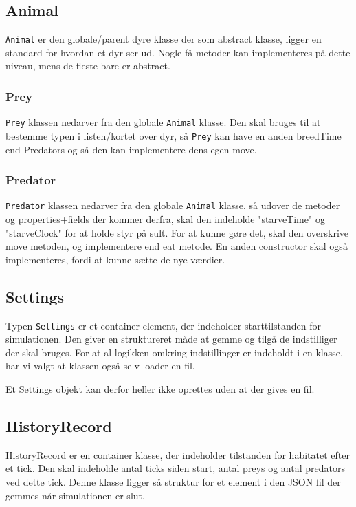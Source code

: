 \documentclass[a4paper]{article}
\begin{document}
    \subsection*{Animal}
      \texttt{Animal} er den globale/parent dyre klasse der som abstract klasse,
      ligger en standard for hvordan et dyr ser ud.
      Nogle få metoder kan implementeres på dette niveau, mens de fleste bare er abstract.

      \subsubsection*{Prey}
        \texttt{Prey} klassen nedarver fra den globale \texttt{Animal} klasse.
        Den skal bruges til at bestemme typen i listen/kortet over dyr,
        så \texttt{Prey} kan have en anden breedTime end Predators og så den kan implementere dens egen move.

      \subsubsection*{Predator}
        \texttt{Predator} klassen nedarver fra den globale \texttt{Animal} klasse,
        så udover de metoder og properties+fields der kommer derfra, skal den indeholde "starveTime"
        og "starveClock" for at holde styr på sult. For at kunne gøre det, skal den overskrive move metoden,
        og implementere end eat metode. En anden constructor skal også implementeres, fordi at kunne sætte de nye værdier.

    \subsection*{Settings} \label{ssec:designSettings}
      Typen \texttt{Settings} er et container element, 
      der indeholder starttilstanden for simulationen.
      Den giver en struktureret måde at gemme og tilgå de indstilliger der skal bruges.
      For at al logikken omkring indstillinger er indeholdt i en klasse,
      har vi valgt at klassen også selv loader en fil.

      Et Settings objekt kan derfor heller ikke oprettes uden at der gives en fil.

    \subsection*{HistoryRecord}
      HistoryRecord er en container klasse, der indeholder tilstanden for habitatet efter et tick.
      Den skal indeholde antal ticks siden start, antal preys og antal predators ved dette tick.
      Denne klasse ligger så struktur for et element i den JSON fil der gemmes når simulationen er slut.
\end{document}
